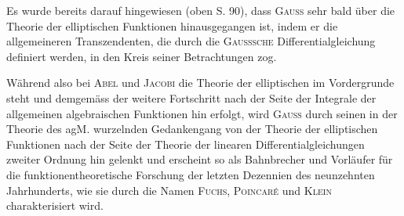 \clearpage{}
Es wurde bereits darauf hingewiesen (oben S. 90), dass \textsc{Gauss} sehr bald
über die Theorie der elliptischen Funktionen hinausgegangen ist, indem er
die allgemeineren Transzendenten, die durch die \textsc{Gausssche} Differentialgleichung
definiert werden, in den Kreis seiner Betrachtungen zog.

Während also bei \textsc{Abel} und \textsc{Jacobi} die Theorie der elliptischen 
im Vordergrunde steht und demgemäss der weitere Fortschritt nach
der Seite der Integrale der allgemeinen algebraischen Funktionen hin erfolgt,
wird \textsc{Gauss} durch seinen in der Theorie des agM. wurzelnden Gedankengang
von der Theorie der elliptischen Funktionen nach der Seite der Theorie der
linearen Differentialgleichungen zweiter Ordnung hin gelenkt und erscheint
so als Bahnbrecher und Vorläufer für die funktionentheoretische Forschung
der letzten Dezennien des neunzehnten Jahrhunderts, wie sie durch die Namen
\textsc{Fuchs}, \textsc{Poincaré} und \textsc{Klein} charakterisiert wird.

